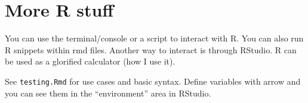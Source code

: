 \section{More R stuff} 
You can use the terminal/console or a script to interact with R. You can also run R snippets within rmd files. Another way to interact is through RStudio. R can be used as a glorified calculator (how I use it).

See \texttt{testing.Rmd} for use cases and basic syntax. Define variables with arrow and you can see them in the ``environment'' area in RStudio.
